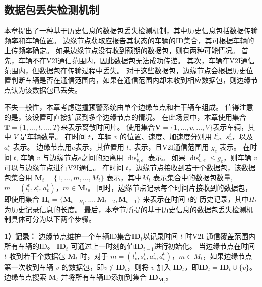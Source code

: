 \subsection{数据包丢失检测机制}

本章提出了一种基于历史信息的数据包丢失检测机制，其中历史信息包括数据传输频率和车辆位置。
边缘节点获取应报告其状态的车辆的ID集合，其可根据车辆的上传频率确定。
如果边缘节点没有收到预期的数据包，则有两种可能情况。
首先，车辆不在V2I通信范围内，因此数据包无法成功传递。
其次，车辆在V2I通信范围内，但数据包在传输过程中丢失。
对于这些数据包，边缘节点会根据历史位置判断车辆是否在通信范围内，如果在通信范围内却未收到相应数据包，则边缘节点认为该数据包已丢失。

不失一般性，本章考虑碰撞预警系统由单个边缘节点和若干辆车组成。
值得注意的是，该设置可直接扩展到多个边缘节点的情况。
在此场景中，本章使用集合$\mathbf{T}=\{1, \ldots, t, \ldots, T\}$来表示离散时间片。
使用集合$\mathbf{V}=\{1, \ldots, v, \ldots, V\}$表示车辆，其中 $V$ 是车辆数量。
在时间 $t$，车辆 $v$ 的位置、速度、加速度分别用 $l_{v}^{t}$、$s_{v}^{t}$，以及$a_{v}^{t}$ 表示。
边缘节点用$e$表示，其位置用 ${l}_{e}$ 表示，且V2I通信范围用 $g_e$ 表示。
在时间 $t$, 车辆 $v$ 与边缘节点$e$之间的距离用 $\operatorname{dis}_{v, e}^{t}$ 表示。
如果 $\operatorname{dis}_{v, e}^{t} \leq g_e$，则车辆 ${v}$ 可以与边缘节点进行V2I通信。
在时间 $t$，边缘节点接收到若干个数据包，该数据包集合用 $\mathbf{M}_{t}=\{1, \ldots, m, \ldots, {M}_t\}$ 表示，其中${M}_t$ 表示集合中的数据包数量, $m =(l_{v}^{t}, s_{v}^{t}, a_{v}^{t})$，$m \in \mathbf{M}_{t}$。
同时，边缘节点记录每个时间片接收到的数据包，即使用集合 ${\mathbf{H}_{t}} = \{\mathbf{M}_{t-{H}_{t}}, \ldots, \mathbf{M}_{t-2}, \mathbf{M}_{t-1}\}$ 来表示在时间 $t$的 历史记录，其中${H}_{t}$为历史记录信息的长度。
最后，本章节所提的基于历史信息的数据包丢失检测机制具体可分为以下两个步骤。

\textbf{1）记录：}
边缘节点维护一个车辆ID集合$\mathbf{ID}_{t}$以记录时间 $t$ 时V2I 通信覆盖范围内所有车辆的ID。
$\mathbf{ID}_{t}$ 可通过上一时刻的值$\mathbf{ID}_{t-1}$进行初始化。 
当边缘节点在时间 $t$ 收到若干个数据包 $\mathbf{M}_{t}$ 时，对于 $m=(l_{v}^{t}, s_{v}^{t}, a_{v}^{t}, d_{v}^{t})$，${m} \in M_{t}$，如果边缘节点第一次收到车辆 $v$ 的数据包，即${v} \notin \mathbf{ID}_{t}$，则将 $v$ 加入 $\mathbf{ID}_{t}$，即$\mathbf{ID}_{t} = \mathbf{ID}_{t} \cup \{v\}$。
边缘节点搜索 $\mathbf{M}_{t}$ 并将所有车辆ID添加到集合 $\mathbf{ID}_{\mathbf{M}_{t}}$。


